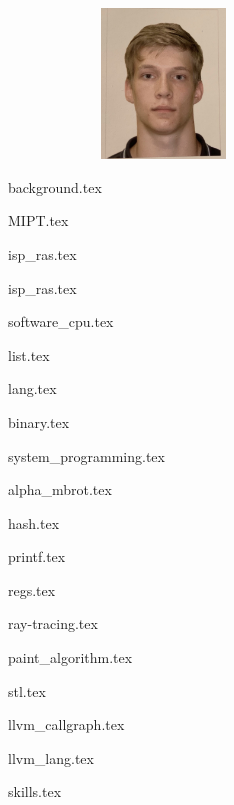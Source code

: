 \documentclass[11pt]{article}
\begin{document}
\begin{figure}[t]
    \noindent 
    \begin{figure}
        \begin{flushright}
            \includegraphics[width=4cm,height=4cm,keepaspectratio]{components/for_CV.jpg}
        \end{flushright}
    \end{figure}
\end{figure}

\noindent

{background.tex}


{MIPT.tex}


{isp_ras.tex}


{isp_ras.tex}


{software_cpu.tex}

{list.tex}

{lang.tex}

{binary.tex}

{system_programming.tex}


{alpha_mbrot.tex}

{hash.tex}


{printf.tex}

{regs.tex}


{ray-tracing.tex}

{paint_algorithm.tex}

{stl.tex}


{llvm_callgraph.tex}

{llvm_lang.tex}


{skills.tex}
\end{document}
